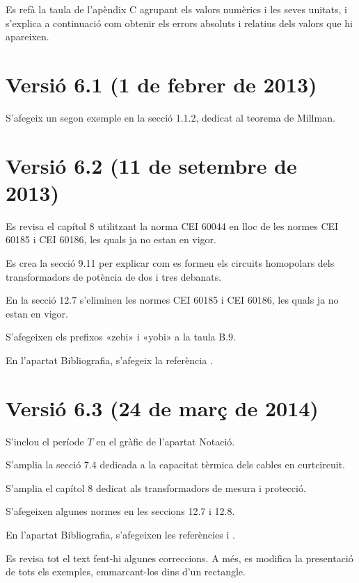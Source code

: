 Es refà la taula de l'apèndix C agrupant els valors numèrics i les seves unitats, i s'explica a continuació com obtenir els errors absoluts i relatius dels valors que hi apareixen.

\section*{Versió 6.1 (1 de febrer de 2013)}

S'afegeix un segon exemple en la secció 1.1.2, dedicat al teorema de Millman.


\section*{Versió 6.2 (11 de setembre de 2013)}

 Es revisa el capítol 8 utilitzant la norma CEI 60044 en lloc de les normes CEI 60185 i CEI 60186, les quals ja no estan en vigor.

Es crea la secció 9.11 per explicar com es formen els circuits homopolars dels transformadors de potència de dos i tres debanats.

En la secció 12.7 s'eliminen les normes CEI 60185 i CEI 60186, les quals ja no estan en vigor.

S'afegeixen els prefixos «zebi» i «yobi» a la taula B.9.

En l'apartat Bibliografia, s'afegeix la referència \cite{RASe}.

\section*{Versió 6.3 (24 de març de 2014)}

S'inclou el període $T$ en el gràfic de l'apartat Notació.

S'amplia la secció 7.4 dedicada a la capacitat tèrmica dels cables en curtcircuit.

S'amplia el capítol 8 dedicat als transformadors de mesura i protecció.

S'afegeixen algunes normes en les seccions 12.7 i 12.8.

En l'apartat Bibliografia, s'afegeixen les referències \cite{KAS} i \cite{JCD}.

Es revisa tot el text fent-hi algunes correccions. A més, es modifica la presentació de tots els exemples, emmarcant-los dins d'un rectangle.


